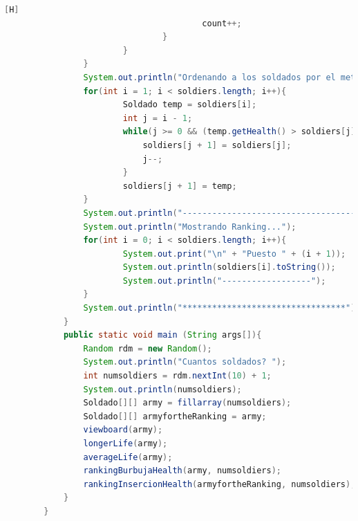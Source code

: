 \documentclass{article}
\begin{document}
\begin{lstlisting}[language=java,caption={Las lineas de codigos del metodo creado:}][H]
										count++;
								}
						}
				}
				System.out.println("Ordenando a los soldados por el metodo insercion: "); //APLICAMOS EL METODO INSERCION CON LOS PUNTOS DE VIDA
				for(int i = 1; i < soldiers.length; i++){
						Soldado temp = soldiers[i];
						int j = i - 1;
						while(j >= 0 && (temp.getHealth() > soldiers[j].getHealth())){
							soldiers[j + 1] = soldiers[j];
							j--;
						}
						soldiers[j + 1] = temp;
				}
				System.out.println("------------------------------------------");
				System.out.println("Mostrando Ranking...");
				for(int i = 0; i < soldiers.length; i++){
						System.out.print("\n" + "Puesto " + (i + 1));
						System.out.println(soldiers[i].toString());
						System.out.println("------------------");
				}
				System.out.println("*********************************");
			}
			public static void main (String args[]){
				Random rdm = new Random();
				System.out.println("Cuantos soldados? ");
				int numsoldiers = rdm.nextInt(10) + 1;
				System.out.println(numsoldiers);
				Soldado[][] army = fillarray(numsoldiers);
				Soldado[][] armyfortheRanking = army;
				viewboard(army);
				longerLife(army);
				averageLife(army);
				rankingBurbujaHealth(army, numsoldiers);
				rankingInsercionHealth(armyfortheRanking, numsoldiers);
			}
		}
	\end{lstlisting}
\end{document}
